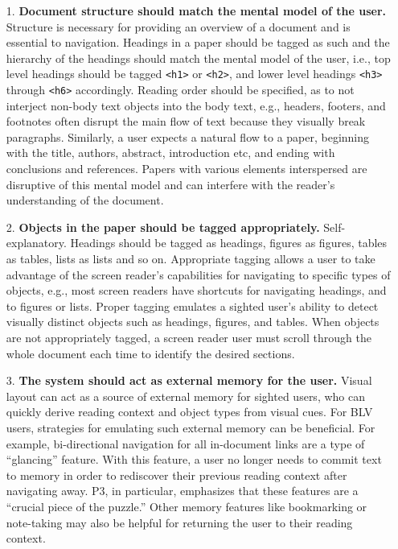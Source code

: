 \begin{enumerate}[itemsep=4pt]
    \item[1.] \textbf{Document structure should match the mental model of the user.} Structure is necessary for providing an overview of a document and is essential to navigation. Headings in a paper should be tagged as such and the hierarchy of the headings should match the mental model of the user, i.e., top level headings should be tagged \texttt{<h1>} or \texttt{<h2>}, and lower level headings \texttt{<h3>} through \texttt{<h6>} accordingly. Reading order should be specified, as to not interject non-body text objects into the body text, e.g., headers, footers, and footnotes often disrupt the main flow of text because they visually break paragraphs. Similarly, a user expects a natural flow to a paper, beginning with the title, authors, abstract, introduction etc, and ending with conclusions and references. Papers with various elements interspersed are disruptive of this mental model and can interfere with the reader's understanding of the document.

    \item[2.] \textbf{Objects in the paper should be tagged appropriately.} Self-explanatory. Headings should be tagged as headings, figures as figures, tables as tables, lists as lists and so on. Appropriate tagging allows a user to take advantage of the screen reader's capabilities for navigating to specific types of objects, e.g., most screen readers have shortcuts for navigating headings, and to figures or lists. Proper tagging emulates a sighted user's ability to detect visually distinct objects such as headings, figures, and tables. When objects are not appropriately tagged, a screen reader user must scroll through the whole document each time to identify the desired sections.

    \item[3.] \textbf{The system should act as external memory for the user.} 
    Visual layout can act as a source of external memory for sighted users, who can quickly derive reading context and object types from visual cues. For BLV users, strategies for emulating such external memory can be beneficial. For example, bi-directional navigation for all in-document links are a type of ``glancing'' feature. With this feature, a user no longer needs to commit text to memory in order to rediscover their previous reading context after navigating away. P3, in particular, emphasizes that these features are a ``crucial piece of the puzzle.'' Other memory features like bookmarking or note-taking may also be helpful for returning the user to their reading context.


\end{enumerate}
